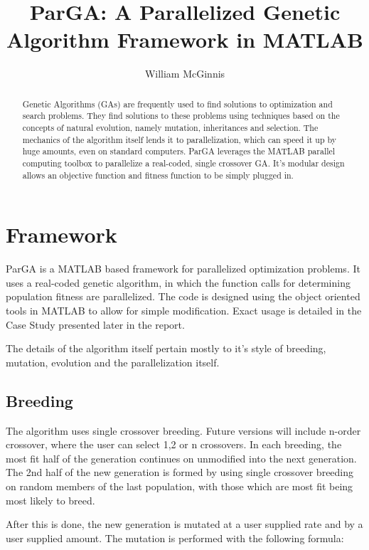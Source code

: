 \documentclass[conference]{IEEEtran}
\title{ParGA: A Parallelized Genetic Algorithm Framework in MATLAB}
\author{William McGinnis}
\begin{document}
\maketitle
\begin{abstract}
Genetic Algorithms (GAs) are frequently used to find solutions to optimization and search problems.  They find solutions to these problems using techniques based on the concepts of natural evolution, namely mutation, inheritances and selection.  The mechanics of the algorithm itself lends it to parallelization, which can speed it up by huge amounts, even on standard computers.  ParGA leverages the MATLAB parallel computing toolbox to parallelize a real-coded, single crossover GA.  It's modular design allows an objective function and fitness function to be simply plugged in.
\end{abstract}

\section{Framework}

ParGA is a MATLAB based framework for parallelized optimization problems.  It uses a real-coded genetic algorithm, in which the function calls for determining population fitness are parallelized.  The code is designed using the object oriented tools in MATLAB to allow for simple modification.  Exact usage is detailed in the Case Study presented later in the report.

The details of the algorithm itself pertain mostly to it's style of breeding, mutation, evolution and the parallelization itself.  

\subsection{Breeding}

The algorithm uses single crossover breeding.  Future versions will include n-order crossover, where the user can select 1,2 or n crossovers.  In each breeding, the most fit half of the generation continues on unmodified into the next generation.  The 2nd half of the new generation is formed by using single crossover breeding on random members of the last population, with those which are most fit being most likely to breed.

After this is done, the new generation is mutated at a user supplied rate and by a user supplied amount.  The mutation is performed with the following formula:
\end{document}
